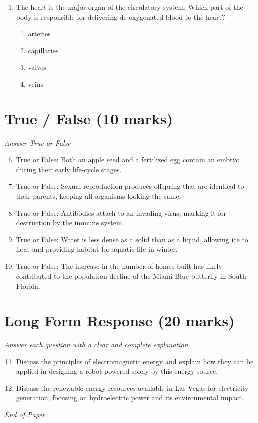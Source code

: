 \documentclass[12pt]{article}
\begin{document}
\begin{enumerate}[label=\arabic*.]
\begin{enumerate}[label=(\alph*)]
    \item increase number of windows
    \item increase thickness of insulation
\end{enumerate}
\item The heart is the major organ of the circulatory system. Which part of the body is responsible for delivering de-oxygenated blood to the heart?
\begin{enumerate}[label=(\alph*)]
    \item arteries
    \item capillaries
    \item valves
    \item veins
\end{enumerate}
\end{enumerate}

\section*{True / False (10 marks)}
\textit{Answer True or False}
\begin{enumerate}[label=\arabic*.]
\setcounter{enumi}{5}
\item True or False: Both an apple seed and a fertilized egg contain an embryo during their early life-cycle stages.
\item True or False: Sexual reproduction produces offspring that are identical to their parents, keeping all organisms looking the same.
\item True or False: Antibodies attach to an invading virus, marking it for destruction by the immune system.
\item True or False: Water is less dense as a solid than as a liquid, allowing ice to float and providing habitat for aquatic life in winter.
\item True or False: The increase in the number of homes built has likely contributed to the population decline of the Miami Blue butterfly in South Florida.
\end{enumerate}

\section*{Long Form Response (20 marks)}
\textit{Answer each question with a clear and complete explanation.}
\begin{enumerate}[label=\arabic*.]
\setcounter{enumi}{10}
\item Discuss the principles of electromagnetic energy and explain how they can be applied in designing a robot powered solely by this energy source.
\item Discuss the renewable energy resources available in Las Vegas for electricity generation, focusing on hydroelectric power and its environmental impact.
\end{enumerate}

\vfill
\noindent\textit{End of Paper}
\end{document}
